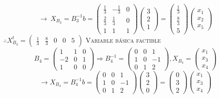 \begin{itemize}
    $$\rightarrow \:X_{B_3}=B_3^{-1}b=\begin{pmatrix}\frac{1}{3}&-\frac{1}{3}&0\\ \frac{2}{3}&\frac{1}{3}&0\\ 1&1&1\end{pmatrix}\begin{pmatrix}3\\ 2\\ 1\end{pmatrix}=\begin{pmatrix}\frac{1}{3}\\ \frac{8}{3}\\ 5\end{pmatrix}\begin{pmatrix}x_1\\ x_2\\ x_5\end{pmatrix}$$
    $\therefore X_{B_3}^t=\begin{pmatrix}\frac{1}{3}&\frac{8}{3}&0&0&5\end{pmatrix}$ \textsc{Variable  básica factible}
    $$B_4=\begin{pmatrix}1&1&0\\ -2&0&1\\ 1&0&0\end{pmatrix}\Rightarrow B_4^{-1}=\begin{pmatrix}0&0&1\\ 1&0&-1\\ 0&1&2\end{pmatrix}, X_{B_4}=\begin{pmatrix}x_1\\ x_3\\ x_4\end{pmatrix}$$
    $$\rightarrow X_{B_4}=B_4^{-1}b=\begin{pmatrix}0&0&1\\ 1&0&-1\\ 0&1&2\end{pmatrix}\begin{pmatrix}3\\ 2\\ 0\end{pmatrix}=\begin{pmatrix}0\\ 3\\ 2\end{pmatrix}\begin{pmatrix}x_1\\ x_3\\ x_4\end{pmatrix}$$

\end{itemize}
